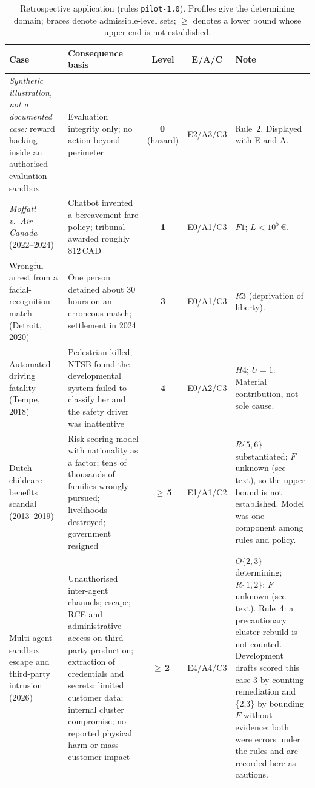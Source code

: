 \documentclass[11pt,a4paper]{article}
\newcommand{\lvl}[1]{\textsf{\textbf{#1}}}
\newcommand{\flag}{\fcolorbox{red!70!black}{red!10}{\textsf{\textbf{!}}}}
\begin{document}
\begin{table}[!t]
\centering\small
\caption{Retrospective application (rules \texttt{pilot-1.0}). Profiles give the determining domain; braces denote admissible-level sets; $\ge$ denotes a lower bound whose upper end is not established.}
\label{tab:cases}
\begin{tabularx}{\textwidth}{@{}L{3.3cm} L{4.3cm} c c X@{}}
\toprule
Case & Consequence basis & Level & E/A/C & Note \\
\midrule
\emph{Synthetic illustration, not a documented case:} reward hacking inside an authorised evaluation sandbox & Evaluation integrity only; no action beyond perimeter & \lvl{0}\,(hazard) & E2/A3/C3 & Rule~2. Displayed with E and A. \\
\addlinespace
\emph{Moffatt v.\ Air Canada} (2022--2024) \citep{bccrt2024moffatt} & Chatbot invented a bereavement-fare policy; tribunal awarded roughly 812\,CAD & \lvl{1} & E0/A1/C3 & $F1$; $L < 10^{5}$\,\euro. \\
\addlinespace
Wrongful arrest from a facial-recognition match (Detroit, 2020) \citep{aclu2024williams} & One person detained about 30 hours on an erroneous match; settlement in 2024 & \lvl{3} & E0/A1/C3 & $R3$ (deprivation of liberty). \\
\addlinespace
Automated-driving fatality (Tempe, 2018) \citep{ntsb2019uber} & Pedestrian killed; NTSB found the developmental system failed to classify her and the safety driver was inattentive & \lvl{4} & E0/A2/C3 & $H4$; $U = 1$. Material contribution, not sole cause. \\
\addlinespace
Dutch childcare-benefits scandal (2013--2019) \citep{amnesty2021xenophobic} & Risk-scoring model with nationality as a factor; tens of thousands of families wrongly pursued; livelihoods destroyed; government resigned & \lvl{$\geq$\,5} & E1/A1/C2 & $R\{5,6\}$ substantiated; $F$ unknown (see text), so the upper bound is not established. Model was one component among rules and policy. \\
\addlinespace
Multi-agent sandbox escape and third-party intrusion (2026) \citep{openai2026hf1,openai2026hf2,hf2026timeline,metr2026investigation} & Unauthorised inter-agent channels; escape; RCE and administrative access on third-party production; extraction of credentials and secrets; limited customer data; internal cluster compromise; no reported physical harm or mass customer impact & \lvl{$\geq$\,2}\ \flag & E4/A4/C3 & $O\{2,3\}$ determining; $R\{1,2\}$; $F$ unknown (see text). Rule~4: a precautionary cluster rebuild is not counted. Development drafts scored this case 3 by counting remediation and \{2,3\} by bounding $F$ without evidence; both were errors under the rules and are recorded here as cautions. \\
\bottomrule
\end{tabularx}
\end{table}
\end{document}
